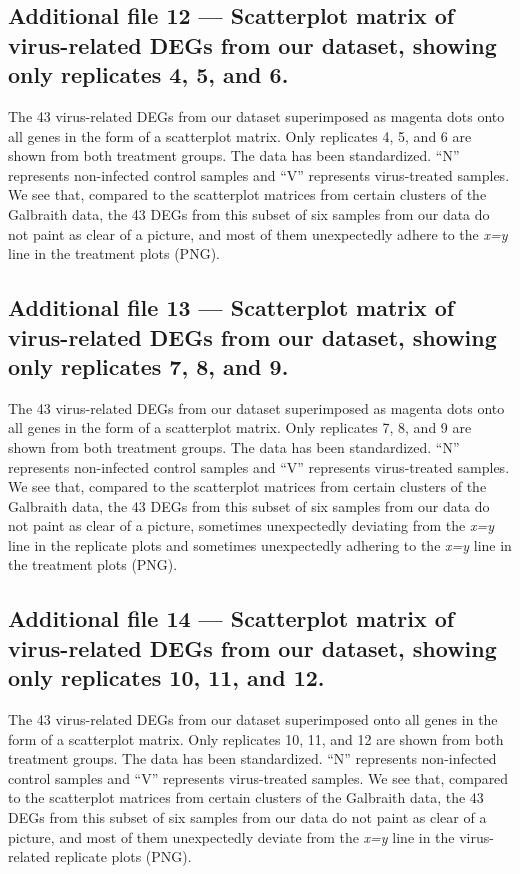\documentclass{bmcart}
\begin{document}
\begin{linenumbers}
\begin{backmatter}
  \subsection*{Additional file 12 --- Scatterplot matrix of virus-related DEGs from our dataset, showing only replicates 4, 5, and 6.}     
    The 43 virus-related DEGs from our dataset superimposed as magenta dots onto all genes in the form of a scatterplot matrix. Only replicates 4, 5, and 6 are shown from both treatment groups. The data has been standardized. ``N'' represents non-infected control samples and ``V'' represents virus-treated samples. We see that, compared to the scatterplot matrices from certain clusters of the Galbraith data, the 43 DEGs from this subset of six samples from our data do not paint as clear of a picture, and most of them unexpectedly adhere to the \textit{x=y} line in the treatment plots (PNG).
    
  \subsection*{Additional file 13 --- Scatterplot matrix of virus-related DEGs from our dataset, showing only replicates 7, 8, and 9.}    
    The 43 virus-related DEGs from our dataset superimposed as magenta dots onto all genes in the form of a scatterplot matrix. Only replicates 7, 8, and 9 are shown from both treatment groups. The data has been standardized. ``N'' represents non-infected control samples and ``V'' represents virus-treated samples. We see that, compared to the scatterplot matrices from certain clusters of the Galbraith data, the 43 DEGs from this subset of six samples from our data do not paint as clear of a picture, sometimes unexpectedly deviating from the \textit{x=y} line in the replicate plots and sometimes unexpectedly adhering to the \textit{x=y} line in the treatment plots (PNG).
    
  \subsection*{Additional file 14 --- Scatterplot matrix of virus-related DEGs from our dataset, showing only replicates 10, 11, and 12.}    
    The 43 virus-related DEGs from our dataset superimposed onto all genes in the form of a scatterplot matrix. Only replicates 10, 11, and 12 are shown from both treatment groups. The data has been standardized. ``N'' represents non-infected control samples and ``V'' represents virus-treated samples. We see that, compared to the scatterplot matrices from certain clusters of the Galbraith data, the 43 DEGs from this subset of six samples from our data do not paint as clear of a picture, and most of them unexpectedly deviate from the \textit{x=y} line in the virus-related replicate plots (PNG).
    

\end{backmatter}
\end{linenumbers}
\end{document}
